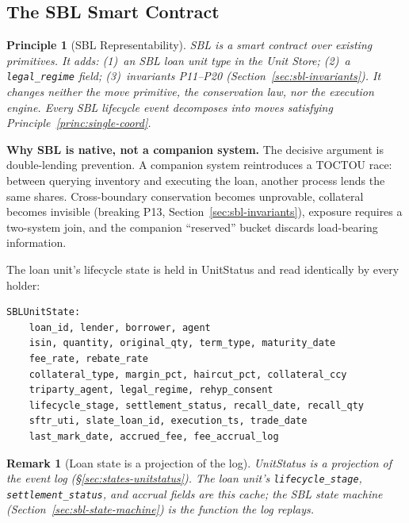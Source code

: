 \documentclass[11pt,a4paper]{article}
\newtheorem{principle}[definition]{Principle}
\newtheorem{remark}[definition]{Remark}
\begin{document}
\subsection{The SBL Smart Contract}
\label{sec:sbl-contract}

\begin{principle}[SBL Representability]
\label{princ:sbl-representable}
SBL is a smart contract over existing primitives. It adds: (1)~an SBL loan unit type in the Unit Store; (2)~a \texttt{legal\_regime} field; (3)~invariants P11--P20 (Section~\ref{sec:sbl-invariants}). It changes neither the move primitive, the conservation law, nor the execution engine. Every SBL lifecycle event decomposes into moves satisfying Principle~\ref{princ:single-coord}.
\end{principle}

\noindent\textbf{Why SBL is native, not a companion system.} The decisive argument is double-lending prevention. A companion system reintroduces a TOCTOU race: between querying inventory and executing the loan, another process lends the same shares. Cross-boundary conservation becomes unprovable, collateral becomes invisible (breaking P13, Section~\ref{sec:sbl-invariants}), exposure requires a two-system join, and the companion ``reserved'' bucket discards load-bearing information.

The loan unit's lifecycle state is held in UnitStatus and read identically by every holder:

\begin{lstlisting}
SBLUnitState:
    loan_id, lender, borrower, agent
    isin, quantity, original_qty, term_type, maturity_date
    fee_rate, rebate_rate
    collateral_type, margin_pct, haircut_pct, collateral_ccy
    triparty_agent, legal_regime, rehyp_consent
    lifecycle_stage, settlement_status, recall_date, recall_qty
    sftr_uti, slate_loan_id, execution_ts, trade_date
    last_mark_date, accrued_fee, fee_accrual_log
\end{lstlisting}

\begin{remark}[Loan state is a projection of the log]
UnitStatus is a projection of the event log (\S\ref{sec:states-unitstatus}). The loan unit's \texttt{lifecycle\_stage}, \texttt{settlement\_status}, and accrual fields are this cache; the SBL state machine (Section~\ref{sec:sbl-state-machine}) is the function the log replays.
\end{remark}
\end{document}

